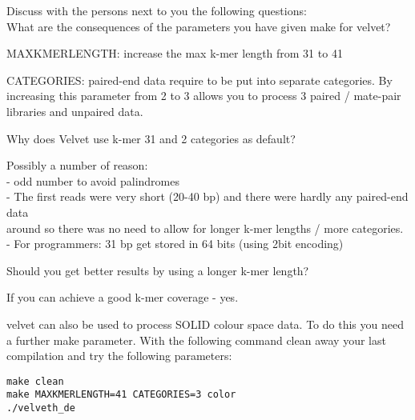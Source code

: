 \begin{questions}
Discuss with the persons next to you the following questions:\\
What are the consequences of the parameters you have given make for velvet?
\begin{answer}
MAXKMERLENGTH: increase the max k-mer length from 31 to 41

CATEGORIES: paired-end data require to be put into separate categories. By
increasing this parameter from 2 to 3 allows you to process 3 paired / mate-pair
libraries and unpaired data.
\end{answer}

Why does Velvet use k-mer 31 and 2 categories as default?
\begin{answer}
Possibly a number of reason:\\
  - odd number to avoid palindromes\\
  - The first reads were very short (20-40 bp) and there were hardly any paired-end data\\
     around so there was no need to allow for longer k-mer lengths / more categories.\\
  - For programmers: 31 bp get stored in 64 bits (using 2bit encoding)
\end{answer}

Should you get better results by using a longer k-mer length?
\begin{answer}
If you can achieve a good k-mer coverage - yes.
\end{answer}
\end{questions}

\begin{bonus}
velvet can also be used to process SOLID colour space data. To do this you need
a further make parameter. With the following command clean away your last
compilation and try the following parameters:
\begin{lstlisting}
make clean
make MAXKMERLENGTH=41 CATEGORIES=3 color
./velveth_de
\end{lstlisting}
\end{bonus}

